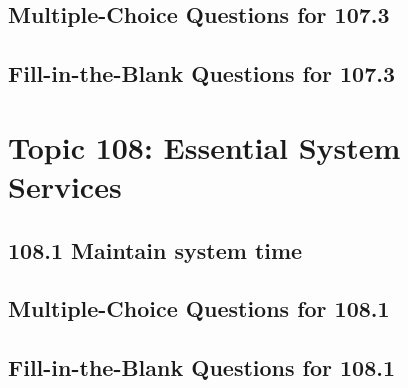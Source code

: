 \documentclass[a4paper]{report}
\begin{document}
\newpage
\section*{Multiple-Choice Questions for 107.3}

\newpage
\section*{Fill-in-the-Blank Questions for 107.3}


\newpage
\chapter{Topic 108: Essential System Services}

\newpage
\section*{108.1 Maintain system time}

\newpage
\section*{Multiple-Choice Questions for 108.1}

\newpage
\section*{Fill-in-the-Blank Questions for 108.1}

\newpage
\end{document}
